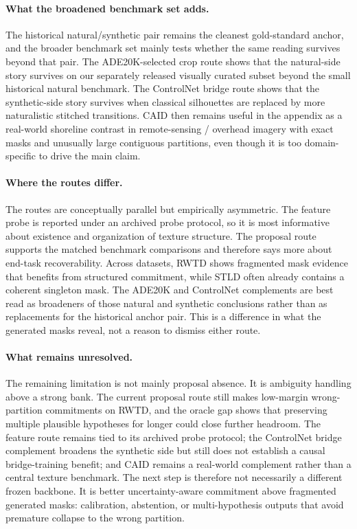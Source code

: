 \paragraph{What the broadened benchmark set adds.} The historical natural/synthetic pair remains the cleanest gold-standard anchor, and the broader benchmark set mainly tests whether the same reading survives beyond that pair. The ADE20K-selected crop route shows that the natural-side story survives on our separately released visually curated subset beyond the small historical natural benchmark. The ControlNet bridge route shows that the synthetic-side story survives when classical silhouettes are replaced by more naturalistic stitched transitions. CAID then remains useful in the appendix as a real-world shoreline contrast in remote-sensing / overhead imagery with exact masks and unusually large contiguous partitions, even though it is too domain-specific to drive the main claim.

\paragraph{Where the routes differ.} The routes are conceptually parallel but empirically asymmetric. The feature probe is reported under an archived probe protocol, so it is most informative about existence and organization of texture structure. The proposal route supports the matched benchmark comparisons and therefore says more about end-task recoverability. Across datasets, RWTD shows fragmented mask evidence that benefits from structured commitment, while STLD often already contains a coherent singleton mask. The ADE20K and ControlNet complements are best read as broadeners of those natural and synthetic conclusions rather than as replacements for the historical anchor pair. This is a difference in what the generated masks reveal, not a reason to dismiss either route.

\paragraph{What remains unresolved.} The remaining limitation is not mainly proposal absence. It is ambiguity handling above a strong bank. The current proposal route still makes low-margin wrong-partition commitments on RWTD, and the oracle gap shows that preserving multiple plausible hypotheses for longer could close further headroom. The feature route remains tied to its archived probe protocol; the ControlNet bridge complement broadens the synthetic side but still does not establish a causal bridge-training benefit; and CAID remains a real-world complement rather than a central texture benchmark. The next step is therefore not necessarily a different frozen backbone. It is better uncertainty-aware commitment above fragmented generated masks: calibration, abstention, or multi-hypothesis outputs that avoid premature collapse to the wrong partition.

